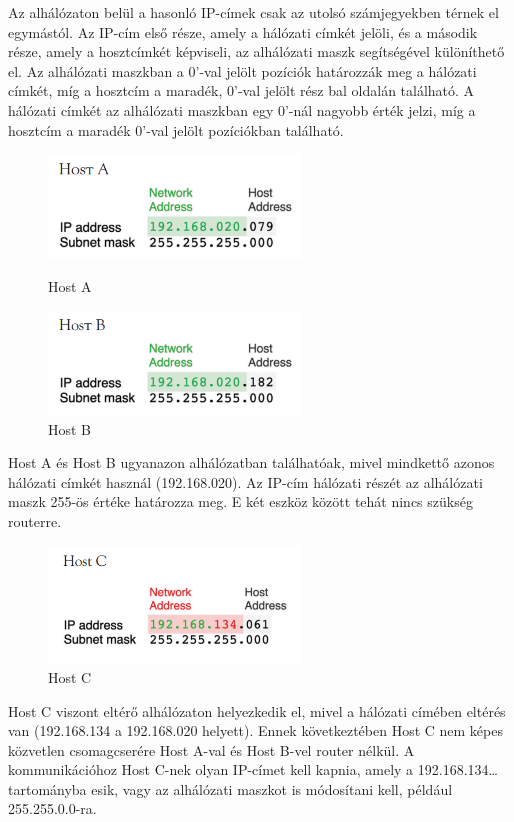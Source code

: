 Az alhálózaton belül a hasonló IP-címek csak az utolsó számjegyekben térnek el egymástól. 
Az IP-cím első része, amely a hálózati címkét jelöli, és a második része, amely a 
hosztcímkét képviseli, az alhálózati maszk segítségével különíthető el. 
Az alhálózati maszkban a 0'-val jelölt pozíciók határozzák meg a hálózati címkét, 
míg a hosztcím a maradék, 0'-val jelölt rész bal oldalán található. 
A hálózati címkét az alhálózati maszkban egy 0'-nál nagyobb érték jelzi, míg a hosztcím a maradék 0'-val jelölt pozíciókban található.
\begin{figure}[H]
    \centering
    \begin{minipage}{0.45\textwidth}
        \centering
        \includegraphics[width=67mm, keepaspectratio]{figures/host_a.png}
        \caption{Host A}
    \end{minipage}\hfill
    \begin{minipage}{0.45\textwidth}
        \centering
        \includegraphics[width=67mm, keepaspectratio]{figures/host_b.png}
        \caption{Host B}
    \end{minipage}
\end{figure}
Host A és Host B ugyanazon alhálózatban találhatóak, mivel mindkettő azonos hálózati címkét használ (192.168.020). 
Az IP-cím hálózati részét az alhálózati maszk 255-ös értéke határozza meg. E két eszköz között tehát nincs szükség routerre.
\begin{figure}[H]
	\centering
	\includegraphics[width=67mm, keepaspectratio]{figures/host_c.png}
	\caption{Host C}
	\label {fig:host_c}
\end{figure}
Host C viszont eltérő alhálózaton helyezkedik el, mivel a hálózati címében eltérés van (192.168.134 a 192.168.020 helyett). 
Ennek következtében Host C nem képes közvetlen csomagcserére Host A-val és Host B-vel router nélkül. 
A kommunikációhoz Host C-nek olyan IP-címet kell kapnia, amely a 192.168.134\ldots tartományba esik, 
vagy az alhálózati maszkot is módosítani kell, például 255.255.0.0-ra.


